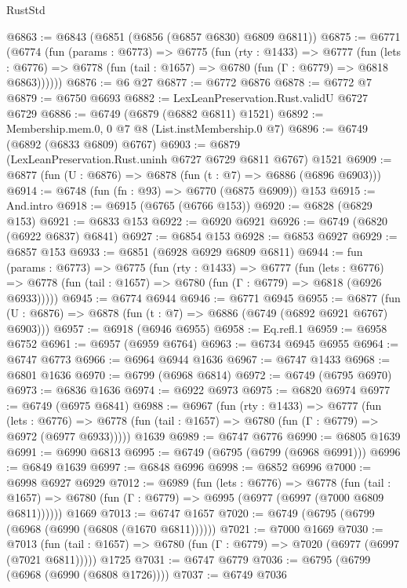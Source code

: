 \begin{lexlean}{RustStd}
\begin{coremodule}
@6863 := @6843 (@6851 (@6856 (@6857 @6830) @6809 @6811))
@6875 := @6771
    (@6774
      (fun (params : @6773) =>
      @6775
        (fun (rty : @1433) =>
        @6777
          (fun (lets : @6776) =>
          @6778 (fun (tail : @1657) => @6780 (fun (Γ : @6779) => @6818 @6863))))))
@6876 := @6 @27
@6877 := @6772 @6876
@6878 := @6772 @7
@6879 := @6750 @6693
@6882 := LexLeanPreservation.Rust.validU @6727 @6729
@6886 := @6749 (@6879 (@6882 @6811) @1521)
@6892 := Membership.mem.{0, 0} @7 @8 (List.instMembership.{0} @7)
@6896 := @6749 (@6892 (@6833 @6809) @6767)
@6903 := @6879 (LexLeanPreservation.Rust.uninh @6727 @6729 @6811 @6767) @1521
@6909 := @6877 (fun (U : @6876) => @6878 (fun (t : @7) => @6886 (@6896 @6903)))
@6914 := @6748 (fun (fn : @93) => @6770 (@6875 @6909)) @153
@6915 := And.intro
@6918 := @6915 (@6765 (@6766 @153))
@6920 := @6828 (@6829 @153)
@6921 := @6833 @153
@6922 := @6920 @6921
@6926 := @6749 (@6820 (@6922 @6837) @6841)
@6927 := @6854 @153
@6928 := @6853 @6927
@6929 := @6857 @153
@6933 := @6851 (@6928 @6929 @6809 @6811)
@6944 := fun (params : @6773) =>
  @6775
    (fun (rty : @1433) =>
    @6777
      (fun (lets : @6776) =>
      @6778 (fun (tail : @1657) => @6780 (fun (Γ : @6779) => @6818 (@6926 @6933)))))
@6945 := @6774 @6944
@6946 := @6771 @6945
@6955 := @6877 (fun (U : @6876) => @6878 (fun (t : @7) => @6886 (@6749 (@6892 @6921 @6767) @6903)))
@6957 := @6918 (@6946 @6955)
@6958 := Eq.refl.{1}
@6959 := @6958 @6752
@6961 := @6957 (@6959 @6764)
@6963 := @6734 @6945 @6955
@6964 := @6747 @6773
@6966 := @6964 @6944 @1636
@6967 := @6747 @1433
@6968 := @6801 @1636
@6970 := @6799 (@6968 @6814)
@6972 := @6749 (@6795 @6970)
@6973 := @6836 @1636
@6974 := @6922 @6973
@6975 := @6820 @6974
@6977 := @6749 (@6975 @6841)
@6988 := @6967
    (fun (rty : @1433) =>
    @6777
      (fun (lets : @6776) =>
      @6778 (fun (tail : @1657) => @6780 (fun (Γ : @6779) => @6972 (@6977 @6933)))))
    @1639
@6989 := @6747 @6776
@6990 := @6805 @1639
@6991 := @6990 @6813
@6995 := @6749 (@6795 (@6799 (@6968 @6991)))
@6996 := @6849 @1639
@6997 := @6848 @6996
@6998 := @6852 @6996
@7000 := @6998 @6927 @6929
@7012 := @6989
    (fun (lets : @6776) =>
    @6778
      (fun (tail : @1657) => @6780 (fun (Γ : @6779) => @6995 (@6977 (@6997 (@7000 @6809 @6811))))))
    @1669
@7013 := @6747 @1657
@7020 := @6749 (@6795 (@6799 (@6968 (@6990 (@6808 (@1670 @6811))))))
@7021 := @7000 @1669
@7030 := @7013
    (fun (tail : @1657) => @6780 (fun (Γ : @6779) => @7020 (@6977 (@6997 (@7021 @6811)))))
    @1725
@7031 := @6747 @6779
@7036 := @6795 (@6799 (@6968 (@6990 (@6808 @1726))))
@7037 := @6749 @7036

\end{coremodule}
\end{lexlean}

